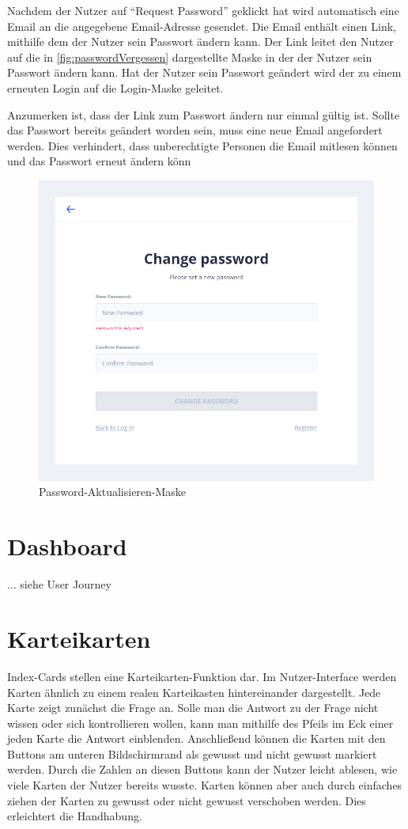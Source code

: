 Nachdem der Nutzer auf \enquote{Request Password} geklickt hat wird automatisch eine Email an die angegebene Email-Adresse gesendet.
Die Email enthält einen Link, mithilfe dem der Nutzer sein Passwort ändern kann.
Der Link leitet den Nutzer auf die in \autoref{fig:passwordVergessen} dargestellte Maske in der der Nutzer sein Passwort ändern kann.
Hat der Nutzer sein Passwort geändert wird der zu einem erneuten Login auf die Login-Maske geleitet.

Anzumerken ist, dass der Link zum Passwort ändern nur einmal gültig ist.
Sollte das Passwort bereits geändert worden sein, muss eine neue Email angefordert werden.
Dies verhindert, dass unberechtigte Personen die Email mitlesen können und das Passwort erneut ändern könn



\begin{figure}[h]
    \centering
    \includegraphics[width=.7\textwidth]{img/passwordReset2.png}
    \caption{Password-Aktualisieren-Maske}
    \label{fig:passwordVergessen2}
\end{figure}



\section{Dashboard}\label{sec:dashboard}
... siehe User Journey


\section{Karteikarten}\label{sec:Karteikarten} %
Index-Cards stellen eine Karteikarten-Funktion dar.
Im Nutzer-Interface werden Karten ähnlich zu einem realen Karteikasten hintereinander dargestellt.
Jede Karte zeigt zunächst die Frage an.
Solle man die Antwort zu der Frage nicht wissen oder sich kontrollieren wollen, kann man mithilfe des Pfeils im Eck einer jeden Karte die Antwort einblenden.
Anschließend können die Karten mit den Buttons am unteren Bildschirmrand als gewusst und nicht gewusst markiert werden.
Durch die Zahlen an diesen Buttons kann der Nutzer leicht ablesen, wie viele Karten der Nutzer bereits wusste.
Karten können aber auch durch einfaches ziehen der Karten zu gewusst oder nicht gewusst verschoben werden.
Dies erleichtert die Handhabung.

